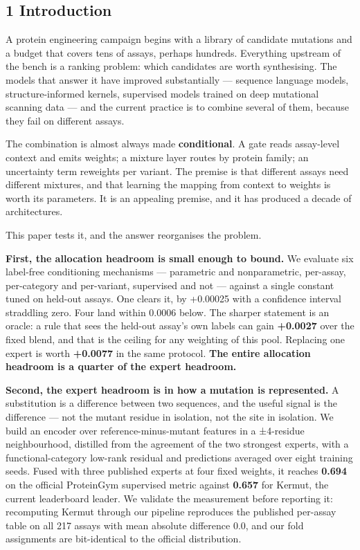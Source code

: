 \hypertarget{introduction}{%
\subsection{1 Introduction}\label{introduction}}

A protein engineering campaign begins with a library of candidate mutations and a budget that covers
tens of assays, perhaps hundreds. Everything upstream of the bench is a ranking problem: which
candidates are worth synthesising. The models that answer it have improved substantially --- sequence
language models, structure-informed kernels, supervised models trained on deep mutational scanning
data --- and the current practice is to combine several of them, because they fail on different assays.

The combination is almost always made \textbf{conditional}. A gate reads assay-level context and emits
weights; a mixture layer routes by protein family; an uncertainty term reweights per variant. The
premise is that different assays need different mixtures, and that learning the mapping from context to
weights is worth its parameters. It is an appealing premise, and it has produced a decade of
architectures.

This paper tests it, and the answer reorganises the problem.

\textbf{First, the allocation headroom is small enough to bound.} We evaluate six label-free conditioning
mechanisms --- parametric and nonparametric, per-assay, per-category and per-variant, supervised and not ---
against a single constant tuned on held-out assays. One clears it, by +0.00025 with a confidence
interval straddling zero. Four land within 0.0006 below. The sharper statement is an oracle: a rule that
sees the held-out assay's own labels can gain \textbf{+0.0027} over the fixed blend, and that is the ceiling
for any weighting of this pool. Replacing one expert is worth \textbf{+0.0077} in the same protocol. \textbf{The
entire allocation headroom is a quarter of the expert headroom.}

\textbf{Second, the expert headroom is in how a mutation is represented.} A substitution is a difference
between two sequences, and the useful signal is the difference --- not the mutant residue in isolation, not
the site in isolation. We build an encoder over reference-minus-mutant features in a ±4-residue
neighbourhood, distilled from the agreement of the two strongest experts, with a functional-category
low-rank residual and predictions averaged over eight training seeds. Fused with three published experts
at four fixed weights, it reaches \textbf{0.694} on the official ProteinGym supervised metric against
\textbf{0.657} for Kermut, the current leaderboard leader. We validate the measurement before reporting it:
recomputing Kermut through our pipeline reproduces the published per-assay table on all 217 assays with
mean absolute difference 0.0, and our fold assignments are bit-identical to the official distribution.

